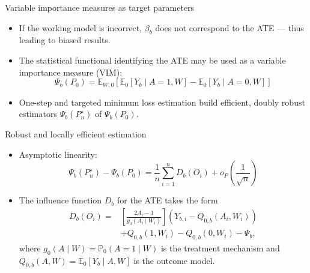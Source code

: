 \documentclass{beamer}
\begin{document}
\begin{frame}[c]{Variable importance measures as target parameters}

\begin{center}
\begin{itemize}
  \itemsep12pt
  \item If the working model is incorrect, $\beta_b$ does not correspond to the
    ATE --- thus leading to biased results.
  \item The statistical functional identifying the ATE may be used as a variable
    importance measure (VIM):
    \[ \Psi_b(P_0) = \mathbb{E}_{W,0}[\mathbb{E}_0[Y_b \mid A = 1, W] -
      \mathbb{E}_0[Y_b \mid A = 0, W]] \]
  \item One-step and targeted minimum loss estimation build efficient, doubly
    robust estimators $\Psi_b(P_n^{\star})$ of $\Psi_b(P_0)$.
\end{itemize}
\end{center}

\end{frame}


\begin{frame}[c]{Robust and locally efficient estimation}

\begin{center}
\begin{itemize}
  \itemsep12pt
  \item Asymptotic linearity:
    \[ \Psi_b(P_n^{\star}) - \Psi_b(P_0) = \frac{1}{n} \sum_{i = 1}^{n}
      D_b(O_i) + o_P\left(\frac{1}{\sqrt{n}}\right) \]
  \item The influence function $D_b$ for the ATE takes the form
    \begin{align*}
      D_b (O_i) =& \left[\frac{2A_i - 1}{g_0(A_i \mid W_i)} \right] (Y_{b, i} -
      Q_{0,b}(A_i, W_i))\\ &+ Q_{0,b}(1, W_i) - Q_{0,b}(0, W_i) - \Psi_b,
    \end{align*}
    where $g_0(A \mid W) = \mathbb{P}_0(A = 1 \mid W)$ is the treatment
    mechanism and $Q_{0,b}(A,W) = \mathbb{E}_0[Y_b \mid A, W]$ is the outcome
    model.
\end{itemize}
\end{center}

\end{frame}
\end{document}
